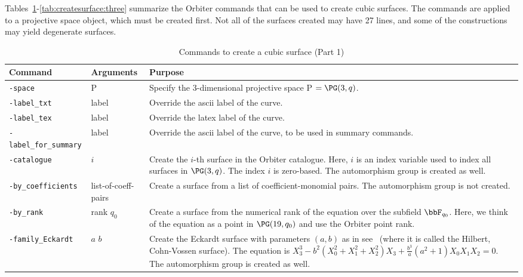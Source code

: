 Tables~\ref{tab:createsurface:one}-\ref{tab:createsurface:three} 
summarize the Orbiter commands that can be used
to create cubic surfaces. 
The commands are applied to a projective space object, 
which must be created first.
Not all of the surfaces created may have 27 lines, 
and some of the constructions may yield degenerate surfaces. 
\begin{table}
\begin{center}
\begin{tabular}{|p{4cm}|p{3cm}|p{7cm}|}
\hline
Command & Arguments & Purpose \\
\hline
\hline
\verb'-space' &  P & Specify the 3-dimensional projective space P $=\PG(3,q)$. \\
\hline
\verb'-label_txt' & label & Override the ascii label of the curve. \\
\hline
\verb'-label_tex' & label & Override the latex label of the curve. \\
\hline
\verb'-label_for_summary' & label & Override the ascii label of the curve, to be used in summary commands. \\
\hline
\verb'-catalogue' & $i$   & 
Create the $i$-th surface in the Orbiter catalogue. 
Here, $i$ is an index variable used to index all surfaces in $\PG(3,q)$. 
The index $i$ is zero-based. 
The automorphism group is created as well. \\
\hline
\verb'-by_coefficients'& list-of-coeff-pairs  & 
Create a surface from a list of coefficient-monomial pairs. 
The automorphism group is not created. \\
\hline
\verb'-by_rank'& rank $q_0$  & 
Create a surface from the numerical rank of the equation over the 
subfield $\bbF_{q_0}$. 
Here, we think of the equation as a 
point in $\PG(19,q_0)$ and use the Orbiter point rank. \\
\hline
\verb'-family_Eckardt' & $a$ $b$  & 
Create the Eckardt surface with parameters $(a,b)$ 
as in see~\cite{BettenKaraoglu19a} 
(where it is called the Hilbert, Cohn-Vossen surface). 
The equation is 
$X_3^3-b^2(X_0^2+X_1^2+X_2^2)X_3+ 
\frac{b^3}{a}(a^2+1)X_0X_1X_2 = 0.$ 
The automorphism group is created as well. \\
\hline
\end{tabular}
\end{center}
\caption{\label{tab:createsurface:one}Commands to create a cubic surface (Part 1)}
\end{table}
